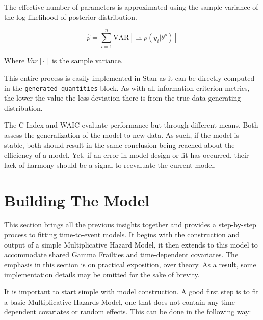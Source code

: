 The effective number of parameters is approximated using the sample variance of the log likelihood of posterior distribution.

$$ \hat{p} = \sum^n_{i=1} \text{VAR}[\ln p(y_i|\theta^s)] $$

Where $Var[\cdot]$ is the sample variance.

This entire process is easily implemented in Stan as it can be directly computed in the \lstinline{generated quantities} block\cite{Vehtari2014}. As with all information criterion metrics, the lower the value the less deviation there is from the true data generating distribution. 

The C-Index and WAIC evaluate performance but through different means. Both assess the generalization of the model to new data. As such, if the model is stable, both should result in the same conclusion being reached about the efficiency of a model. Yet, if an error in model design or fit has occurred, their lack of harmony should be a signal to reevaluate the current model. 




\section*{Building The Model}

This section brings all the previous insights together and provides a step-by-step process to fitting time-to-event models. It begins with the construction and output of a simple Multiplicative Hazard Model, it then extends to this model to accommodate shared Gamma Frailties and time-dependent covariates. The emphasis in this section is on practical exposition, over theory. As a result, some implementation details may be omitted for the sake of brevity. 

It is important to start simple with model construction. A good first step is to fit a basic Multiplicative Hazards Model, one that does not contain any time-dependent covariates or random effects. This can be done in the following way:




